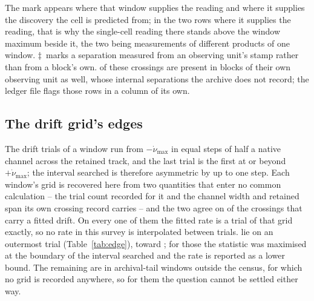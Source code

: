 \begin{table}
{The mark appears where that window supplies the reading and where it supplies
the discovery the cell is predicted from; in the two rows where it supplies
the reading, that is why the single-cell reading there stands above the
window maximum beside it, the two being measurements of different products of
one window. $\ddagger$~marks a separation measured
from an observing unit's stamp rather than from a block's own.
\QcNUnrecWord{} of these crossings are present in blocks of their own
observing unit as well, whose internal separations the archive does not
record; the ledger file flags those rows in a column of its own.}
\label{tab:confirm}
\small
\setlength{\tabcolsep}{4.5pt}

\end{table}

\subsection{The drift grid's edges}
\label{sec:edge}

The drift trials of a window run from $-\dot\nu_{\max}$ in equal steps of
half a native channel across the retained track, and the last trial is the
first at or beyond $+\dot\nu_{\max}$; the interval searched is therefore
asymmetric by up to one step. Each window's grid is recovered here from two
quantities that enter no common calculation -- the trial count recorded for
it and the channel width and retained span its own crossing record carries
-- and the two agree on \EgNGrid{} of the \EgNDrift{} crossings that carry a
fitted drift. On every one of them the fitted rate is a trial of that grid
exactly, so no rate in this survey is interpolated between trials.
\EgNEdge{} lie on an outermost trial (Table~\ref{tab:edge}), toward
\EgEdgeStars; for those the statistic was maximised at the boundary of the
interval searched and the rate is reported as a lower bound. The remaining
\EgNNoGrid{} are in archival-tail windows outside the census, for which no
grid is recorded anywhere, so for them the question cannot be settled either
way.

